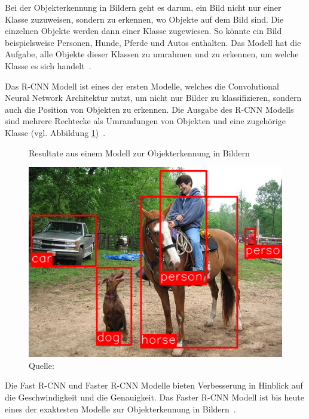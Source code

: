 Bei der Objekterkennung in Bildern geht es darum, ein Bild nicht nur einer Klasse zuzuweisen, sondern zu erkennen, wo Objekte auf dem Bild sind. Die einzelnen Objekte werden dann einer Klasse zugewiesen. So könnte ein Bild beispielsweise Personen, Hunde, Pferde und Autos enthalten. Das Modell hat die Aufgabe, alle Objekte dieser Klassen zu umrahmen und zu erkennen, um welche Klasse es sich handelt~\autocite{Goodfellow2016}.

Das R-CNN Modell ist eines der ersten Modelle, welches die Convolutional Neural Network Architektur nutzt, um nicht nur Bilder zu klassifizieren, sondern auch die Position von Objekten zu erkennen. Die Ausgabe des R-CNN Modells sind mehrere Rechtecke als Umrandungen von Objekten und eine zugehörige Klasse (vgl. Abbildung \ref{fig:rcnn})~\autocite{SSD}.

\begin{figure}[h]
    \captionsetup{width=.9\linewidth}
    \caption{Resultate aus einem Modell zur Objekterkennung in Bildern}
    \label{fig:rcnn}
    \centering
    \includegraphics[scale=0.4]{graphics/rcnn.png}
    \vspace*{0.3cm}
    \caption*{Quelle: \textcite{SSD}}
\end{figure}

Die Fast R-CNN und Faster R-CNN Modelle bieten Verbesserung in Hinblick auf die Geschwindigkeit und die Genauigkeit. Das Faster R-CNN Modell ist bis heute eines der exaktesten Modelle zur Objekterkennung in Bildern~\autocite{SSD}.

